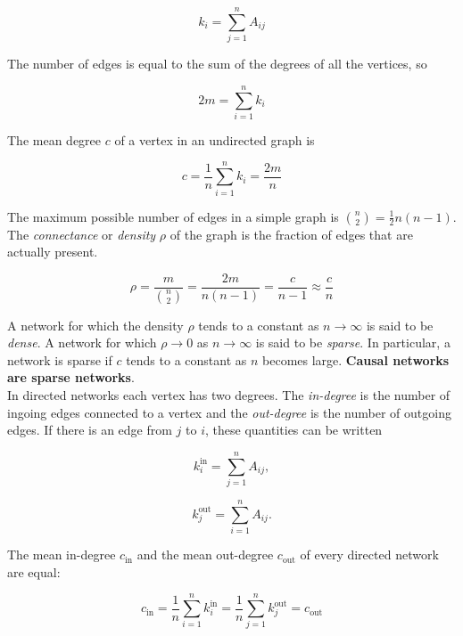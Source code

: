 \documentclass[12pt]{book}
\begin{document}
\begin{equation}
k_i = \sum\limits_{j=1}^n A_{ij}
\end{equation}

The number of edges is equal to the sum of the degrees of all the vertices, so

\begin{equation}
2m = \sum\limits_{i=1}^n k_i
\end{equation}

The mean degree $c$ of a vertex in an undirected graph is

\begin{equation}
c = \frac{1}{n} \sum\limits_{i=1}^n k_i = \frac{2m}{n}
\end{equation}

The maximum possible number of edges in a simple graph is $\binom{n}{2} = \frac{1}{2}n(n-1)$.  The \textit{connectance} or \textit{density} $\rho$ of the graph is the fraction of edges that are actually present.

\begin{equation}
\rho = \frac{m}{\binom{n}{2}} = \frac{2m}{n(n-1)} = \frac{c}{n-1} \approx \frac{c}{n}
\end{equation}

A network for which the density $\rho$ tends to a constant as $n \rightarrow \infty$ is said to be \textit{dense}.  A network for which $\rho \rightarrow 0$ as $n \rightarrow \infty$ is said to be \textit{sparse}.  In particular, a network is sparse if $c$ tends to a constant as $n$ becomes large.  \textbf{Causal networks are sparse networks}. \\

In directed networks each vertex has two degrees.  The \textit{in-degree} is the number of ingoing edges connected to a vertex and the \textit{out-degree} is the number of outgoing edges.  If there is an edge from $j$ to $i$, these quantities can be written

\begin{equation}
k_i^{\textrm{in}} = \sum\limits_{j=1}^n A_{ij},
\end{equation}

\begin{equation}
k_j^{\textrm{out}} = \sum\limits_{i=1}^n A_{ij}.
\end{equation}

The mean in-degree $c_{\textrm{in}}$ and the mean out-degree $c_{\textrm{out}}$ of every directed network are equal:

\begin{equation}
c_{\textrm{in}} = \frac{1}{n} \sum\limits_{i=1}^n k_i^{\textrm{in}} = \frac{1}{n} \sum\limits_{j=1}^n k_j^{\textrm{out}} = c_{\textrm{out}}
\end{equation}
\end{document}

